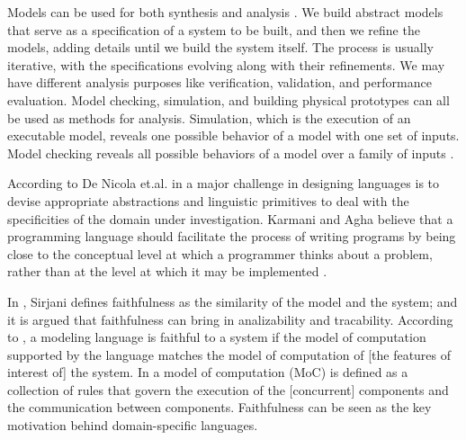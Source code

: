 Models can be used for both synthesis and analysis \cite{DBLP:conf/facs2/LeeS18}. We build abstract models that serve as a specification of a system to be built, and then we refine the models, adding
details until we build the system itself. The process is usually iterative, with
the specifications evolving along with their refinements. We may have different analysis purposes like verification, validation, and performance evaluation. 
Model checking, simulation, and building physical prototypes can all be used as methods for analysis. Simulation, which is the execution of an executable
model, reveals one possible behavior of a model with one set of inputs. Model
checking reveals all possible behaviors of a model over a family of inputs \cite{DBLP:conf/facs2/LeeS18}.



According to De Nicola et.al. in \cite{DBLP:conf/coordination/NicolaFPT18} a major challenge in designing languages is to devise appropriate abstractions and linguistic primitives to deal with the specificities of the domain under investigation.
%
Karmani and Agha believe that a programming language should facilitate the process of writing programs by being close to the conceptual level at which a programmer thinks about a problem, rather than at the level at which it may be implemented \cite{DBLP:reference/parallel/KarmaniA11}. 

In \cite{DBLP:conf/birthday/FriendlinessSirjani18}, Sirjani defines faithfulness as the similarity of the
model and the system; and it is argued that faithfulness can bring in analizability and tracability. 
According to \cite{DBLP:conf/birthday/FriendlinessSirjani18}, a modeling
language is faithful to a system if the model of computation supported by the
language matches the model of computation of [the features of interest of] the
system. 
In \cite{Ptolemy:14:Book} a model of computation (MoC) is defined as a collection of rules that govern
the execution of the [concurrent] components and the communication between
components.
Faithfulness can be seen as the key motivation behind domain-specific
languages.

